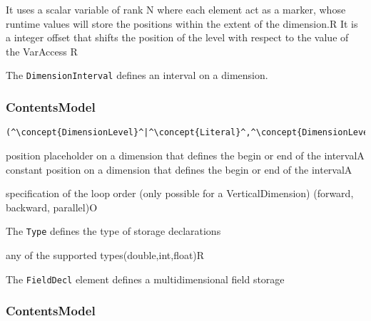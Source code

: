 \begin{HIRChildElements}
	{It uses a scalar variable of rank N where each element act as a marker, whose runtime values will store the positions within the extent of the dimension.}{R}
	{It is a integer offset that shifts the position of the level with respect to the value of the VarAccess }{R}
\end{HIRChildElements}


The {\tt DimensionInterval} defines an interval on a dimension.

\subsubsection*{ContentsModel}{}

\begin{lstlisting}[style=default,frame=none]
(^\concept{DimensionLevel}^|^\concept{Literal}^,^\concept{DimensionLevel}^|^\concept{Literal}^)
\end{lstlisting}

\begin{HIRChildElements}
	{position placeholder on a dimension that defines the begin or end of the interval}{A}
	{constant position on a dimension that defines the begin or end of the interval}{A}
\end{HIRChildElements}

\begin{HIRAttributesVal}
	{specification of the loop order (only possible for a VerticalDimension) }{(forward, backward, parallel)}{O}
\end{HIRAttributesVal}


The {\tt Type} defines the type of storage declarations
\HIRContentsModel{ () }

\begin{HIRAttributesVal}
	{any of the supported types}{(double,int,float)}{R}
\end{HIRAttributesVal}

The {\tt FieldDecl} element defines a multidimensional field storage
\subsubsection*{ContentsModel}{}

